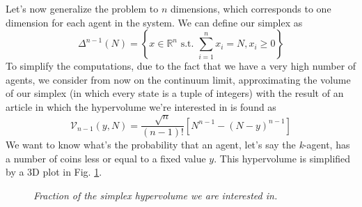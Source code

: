 Let's now generalize the problem to $n$ dimensions, which corresponds to one dimension for each agent in the system.
We can define our simplex as
\begin{equation*}
    \Delta^{n-1}(N)=\left\{x \in \mathbb{R}^n \text{ s.t. } \sum_{i = 1}^n x_i = N, x_i \geq 0\right\}
\end{equation*}
To simplify the computations, due to the fact that we have a very high number of agents, we consider from now on the continuum limit, approximating the volume of our simplex (in which every state is a tuple of integers) with the result of an article \cite{simplexSampling} in which the hypervolume we're interested in is found as
\begin{equation*}
    \mathcal{V}_{n-1}\left(y, N\right) = \frac{\sqrt{n}}{\left(n-1\right)!}\left[N^{n-1} - \left(N - y\right)^{n-1}\right]
\end{equation*}
We want to know what's the probability that an agent, let's say the \emph{k}-agent, has a number of coins less or equal to a fixed value $y$.
This hypervolume is simplified by a 3D plot in Fig. \ref{fig:simplexHypervolume}.
\begin{figure}[H]
    \centering
    \caption{\emph{Fraction of the simplex hypervolume we are interested in.}}
    \label{fig:simplexHypervolume}
\end{figure}
